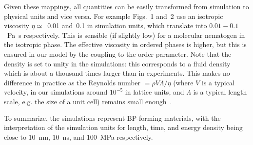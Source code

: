 \documentclass[12pt,twoside]{article}
\begin{document}
Given these mappings, all quantities can be easily transformed from
simulation to physical units and vice versa. For example Figs.~1 and~2
use an isotropic viscosity $\eta \simeq$~0.01 and~0.1 in simulation units,
which translate into $0.01-0.1$~Pa~s respectively. This is sensible (if 
slightly low) for a molecular nematogen in the isotropic phase. 
The effective viscosity in ordered phases is higher, but this is ensured
in our model by the coupling to the order parameter.
Note that the density is set to unity in the simulations: this
corresponds to a fluid density which is about a thousand times larger
than in experiments. This makes no difference in practice as
the Reynolds number $= \rho V\Lambda/\eta$ (where $V$ is a typical
velocity, in our simulations around $10^{-5}$ in lattice units, 
and $\Lambda$ is a typical length scale, e.g. the size of a unit cell) 
remains small enough~\cite{codef}. 

To summarize, the simulations represent BP-forming materials, with the
interpretation of the simulation units for length, time, and energy
density being close to 10~nm, 10~ns, and 100~MPa respectively.


\vfill
\pagebreak
\end{document}

